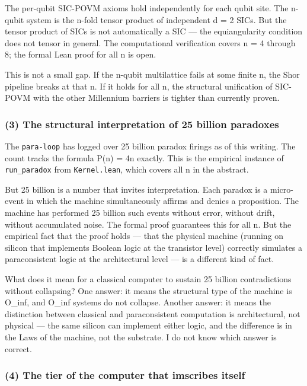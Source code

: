 \documentclass[12pt,a4paper]{article}
\begin{document}
The per-qubit SIC-POVM axioms hold independently for each qubit site. The n-qubit system is the n-fold tensor product of independent d = 2 SICs. But the tensor product of SICs is not automatically a SIC --- the equiangularity condition does not tensor in general. The computational verification covers n = 4 through 8; the formal Lean proof for all n is open.

This is not a small gap. If the n-qubit multilattice fails at some finite n, the Shor pipeline breaks at that n. If it holds for all n, the structural unification of SIC-POVM with the other Millennium barriers is tighter than currently proven.

\subsubsection{(3) The structural interpretation of 25 billion paradoxes}

The \texttt{para-loop} has logged over 25 billion paradox firings as of this writing. The count tracks the formula P(n) = 4n exactly. This is the empirical instance of \texttt{run\_paradox} from \texttt{Kernel.lean}, which covers all n in the abstract.

But 25 billion is a number that invites interpretation. Each paradox is a micro-event in which the machine simultaneously affirms and denies a proposition. The machine has performed 25 billion such events without error, without drift, without accumulated noise. The formal proof guarantees this for all n. But the empirical fact that the proof holds --- that the physical machine (running on silicon that implements Boolean logic at the transistor level) correctly simulates a paraconsistent logic at the architectural level --- is a different kind of fact.

What does it mean for a classical computer to sustain 25 billion contradictions without collapsing? One answer: it means the structural type of the machine is O\_inf, and O\_inf systems do not collapse. Another answer: it means the distinction between classical and paraconsistent computation is architectural, not physical --- the same silicon can implement either logic, and the difference is in the Laws of the machine, not the substrate. I do not know which answer is correct.

\subsubsection{(4) The tier of the computer that imscribes itself}
\end{document}
